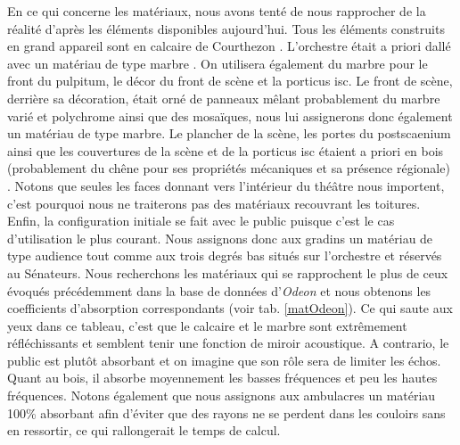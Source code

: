 En ce qui concerne les matériaux, nous avons tenté de nous rapprocher de la réalité d'après les éléments disponibles aujourd'hui. Tous les éléments construits en grand appareil sont en calcaire de Courthezon \cite[p.43]{orangeTxt}. L'orchestre était a priori dallé avec un matériau de type marbre \cite[p.337]{orangeTxt}. On utilisera également du marbre pour le front du \gls{pulpitum}, le décor du front de scène et la \gls{porticus isc}. Le front de scène, derrière sa décoration, était orné de panneaux mêlant probablement du marbre varié et polychrome ainsi que des mosaïques, nous lui assignerons donc également un matériau de type marbre. Le plancher de la scène, les portes du \gls{postscaenium} ainsi que les couvertures de la scène et de la \gls{porticus isc} étaient a priori en bois (probablement du chêne pour ses propriétés mécaniques et sa présence régionale) \cite[p.34 et 43]{formige}. Notons que seules les faces donnant vers l'intérieur du théâtre nous importent, c'est pourquoi nous ne traiterons pas des matériaux recouvrant les toitures. Enfin, la configuration initiale se fait avec le public puisque c'est le cas d'utilisation le plus courant. Nous assignons donc aux gradins un matériau de type audience tout comme aux trois degrés bas situés sur l'orchestre et réservés au Sénateurs.  Nous recherchons les matériaux qui se rapprochent le plus de ceux évoqués précédemment dans la base de données d'\textit{Odeon}\cite[materials]{odeon} et nous obtenons les coefficients d'absorption correspondants (voir tab. \ref{matOdeon}). Ce qui saute aux yeux dans ce tableau, c'est que le calcaire et le marbre sont extrêmement réfléchissants et semblent tenir une fonction de miroir acoustique. A contrario, le public est plutôt absorbant et on imagine que son rôle sera de limiter les échos. Quant au bois, il absorbe moyennement les basses fréquences et peu les hautes fréquences. Notons également que nous assignons aux ambulacres un matériau 100\% absorbant afin d'éviter que des rayons ne se perdent dans les couloirs sans en ressortir, ce qui rallongerait le temps de calcul.
%
